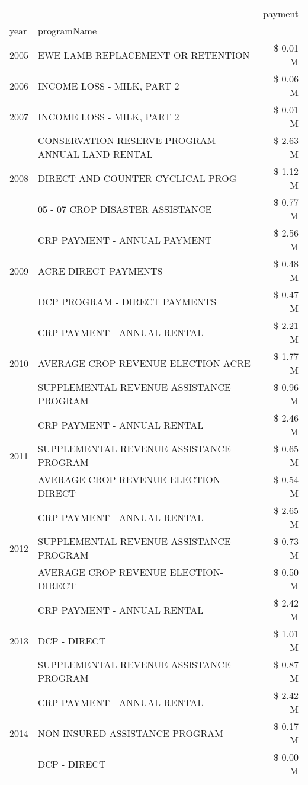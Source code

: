 \begin{tabular}{llr}
\toprule
 &  & payment \\
year & programName &  \\
\midrule
2005 & EWE LAMB REPLACEMENT OR RETENTION & \$ 0.01 M \\
\cline{1-3}
2006 & INCOME LOSS - MILK, PART 2 & \$ 0.06 M \\
\cline{1-3}
2007 & INCOME LOSS - MILK, PART 2 & \$ 0.01 M \\
\cline{1-3}
\multirow[t]{3}{*}{2008} & CONSERVATION RESERVE PROGRAM - ANNUAL LAND RENTAL & \$ 2.63 M \\
 & DIRECT AND COUNTER CYCLICAL PROG & \$ 1.12 M \\
 & 05 - 07 CROP DISASTER ASSISTANCE & \$ 0.77 M \\
\cline{1-3}
\multirow[t]{3}{*}{2009} & CRP PAYMENT - ANNUAL PAYMENT & \$ 2.56 M \\
 & ACRE DIRECT PAYMENTS & \$ 0.48 M \\
 & DCP PROGRAM - DIRECT PAYMENTS & \$ 0.47 M \\
\cline{1-3}
\multirow[t]{3}{*}{2010} & CRP PAYMENT - ANNUAL RENTAL & \$ 2.21 M \\
 & AVERAGE CROP REVENUE ELECTION-ACRE & \$ 1.77 M \\
 & SUPPLEMENTAL REVENUE ASSISTANCE PROGRAM & \$ 0.96 M \\
\cline{1-3}
\multirow[t]{3}{*}{2011} & CRP PAYMENT - ANNUAL RENTAL & \$ 2.46 M \\
 & SUPPLEMENTAL REVENUE ASSISTANCE PROGRAM & \$ 0.65 M \\
 & AVERAGE CROP REVENUE ELECTION-DIRECT & \$ 0.54 M \\
\cline{1-3}
\multirow[t]{3}{*}{2012} & CRP PAYMENT - ANNUAL RENTAL & \$ 2.65 M \\
 & SUPPLEMENTAL REVENUE ASSISTANCE PROGRAM & \$ 0.73 M \\
 & AVERAGE CROP REVENUE ELECTION-DIRECT & \$ 0.50 M \\
\cline{1-3}
\multirow[t]{3}{*}{2013} & CRP PAYMENT - ANNUAL RENTAL & \$ 2.42 M \\
 & DCP - DIRECT & \$ 1.01 M \\
 & SUPPLEMENTAL REVENUE ASSISTANCE PROGRAM & \$ 0.87 M \\
\cline{1-3}
\multirow[t]{3}{*}{2014} & CRP PAYMENT - ANNUAL RENTAL & \$ 2.42 M \\
 & NON-INSURED ASSISTANCE PROGRAM & \$ 0.17 M \\
 & DCP - DIRECT & \$ 0.00 M \\

\end{tabular}
